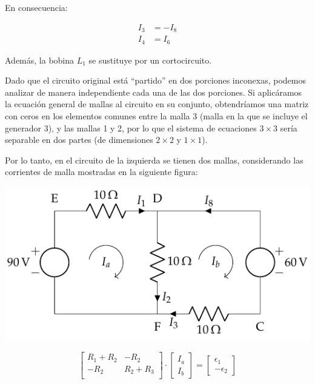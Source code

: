 En consecuencia:

\vspace{-4mm}
\begin{align*}
  I_3 &= -I_8\\
  I_4 &= I_6
\end{align*}

\vspace{2mm}
Además, la bobina $L_1$ se sustituye por un cortocircuito.

\vspace{3mm}
Dado que el circuito original está ``partido'' en dos porciones inconexas, podemos analizar de manera independiente cada una de las dos porciones. Si aplicáramos la ecuación general de mallas al circuito en su conjunto, obtendríamos una matriz con ceros en los elementos comunes entre la malla 3 (malla en la que se incluye el generador 3), y las mallas 1 y 2, por lo que el sistema de ecuaciones $3\times 3$ sería separable en dos partes (de dimensiones $2\times 2$ y $1\times 1$).

\vspace{5mm}
Por lo tanto, en el circuito de la izquierda se tienen dos mallas, considerando las corrientes de malla mostradas en la siguiente figura:

\begin{center}
  \includegraphics{figuras/BT1_10_izq_mallas.pdf}
\end{center}


\begin{equation*}
  \begin{bmatrix}
    R_1 + R_2 & -R_2\\
    -R_2 & R_2 + R_3\\
  \end{bmatrix} \cdot %
  \begin{bmatrix}
    I_a\\
    I_b
  \end{bmatrix} = %
  \begin{bmatrix}
    \epsilon_1\\
    -\epsilon_2
  \end{bmatrix}
\end{equation*}

